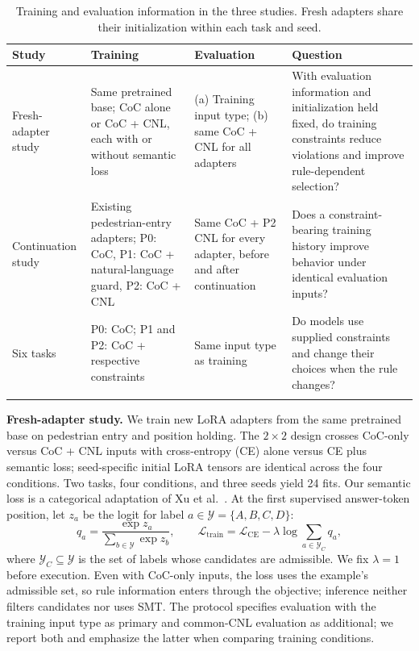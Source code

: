 \begin{table}[tbp]
\caption{Training and evaluation information in the three studies. Fresh
adapters share their initialization within each task and seed.}
\label{tab:setup-comparisons}
\footnotesize
\begin{tabularx}{\textwidth}{@{}>{\raggedright\arraybackslash}p{}>{\raggedright\arraybackslash}X>{\raggedright\arraybackslash}X>{\raggedright\arraybackslash}X@{}}
\toprule
Study & Training & Evaluation & Question\\
\midrule
Fresh-adapter study & Same pretrained base; CoC alone or CoC + CNL, each with or
without semantic loss & (a) Training input type; (b) same CoC + CNL for all
adapters & With evaluation information and initialization held fixed, do
training constraints reduce violations and improve rule-dependent selection?\\[4pt]
Continuation study & Existing pedestrian-entry adapters; P0: CoC,
P1: CoC + natural-language guard, P2: CoC + CNL & Same CoC + P2 CNL for every
adapter, before and after continuation & Does a constraint-bearing training
history improve behavior under identical evaluation inputs?\\[4pt]
Six tasks & P0: CoC; P1 and P2: CoC + respective constraints & Same input type
as training & Do models use supplied constraints and change their choices when
the rule changes?\\
\botrule
\end{tabularx}
\end{table}

\noindent\textbf{Fresh-adapter study.}
We train new LoRA adapters from the same pretrained base on pedestrian entry and
position holding. The $2\times2$ design crosses CoC-only versus CoC + CNL inputs
with cross-entropy (CE) alone versus CE plus semantic loss; seed-specific
initial LoRA tensors are identical across the four conditions. Two tasks, four
conditions, and three seeds yield 24 fits. Our semantic loss is a categorical
adaptation of Xu et al.~\cite{Xu2018}. At the first supervised answer-token
position, let $z_a$ be the logit for label $a\in\mathcal{Y}=\{A,B,C,D\}$:
\begin{equation}\label{eq:setup-semantic-loss}
q_a=\frac{\exp z_a}{\sum_{b\in\mathcal{Y}}\exp z_b},\qquad
\mathcal{L}_{\mathrm{train}}=\mathcal{L}_{\mathrm{CE}}
-\lambda\log\!\sum_{a\in\mathcal{Y}_C}q_a,
\end{equation}
where $\mathcal{Y}_C\subseteq\mathcal{Y}$ is the set of labels whose candidates
are admissible. We fix $\lambda=1$ before execution. Even with CoC-only inputs,
the loss uses the example's admissible set, so rule information enters through
the objective; inference neither filters candidates nor uses SMT. The protocol
specifies evaluation with the training input type as primary and common-CNL
evaluation as additional; we report both and emphasize the latter when
comparing training conditions.


